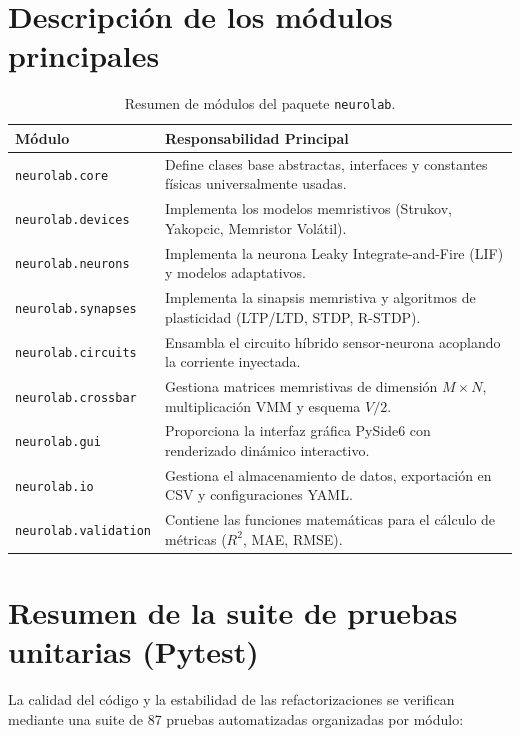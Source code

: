 \section{Descripción de los módulos principales}
\label{sec:descripcion_modulos}

\begin{table}[H]
\caption{Resumen de módulos del paquete \texttt{neurolab}.}
\label{tab:modulos_neurolab}
\centering
\begin{tabular}{l p{10cm}}
\toprule
Módulo & Responsabilidad Principal \\
\midrule
\texttt{neurolab.core} & Define clases base abstractas, interfaces y constantes físicas universalmente usadas. \\
\texttt{neurolab.devices} & Implementa los modelos memristivos (Strukov, Yakopcic, Memristor Volátil). \\
\texttt{neurolab.neurons} & Implementa la neurona Leaky Integrate-and-Fire (LIF) y modelos adaptativos. \\
\texttt{neurolab.synapses} & Implementa la sinapsis memristiva y algoritmos de plasticidad (LTP/LTD, STDP, R-STDP). \\
\texttt{neurolab.circuits} & Ensambla el circuito híbrido sensor-neurona acoplando la corriente inyectada. \\
\texttt{neurolab.crossbar} & Gestiona matrices memristivas de dimensión $M \times N$, multiplicación VMM y esquema $V/2$. \\
\texttt{neurolab.gui} & Proporciona la interfaz gráfica PySide6 con renderizado dinámico interactivo. \\
\texttt{neurolab.io} & Gestiona el almacenamiento de datos, exportación en CSV y configuraciones YAML. \\
\texttt{neurolab.validation} & Contiene las funciones matemáticas para el cálculo de métricas ($R^2$, MAE, RMSE). \\
\bottomrule
\end{tabular}
\end{table}

\section{Resumen de la suite de pruebas unitarias (Pytest)}
\label{sec:suite_tests}

La calidad del código y la estabilidad de las refactorizaciones se verifican mediante una suite de 87 pruebas automatizadas organizadas por módulo:

